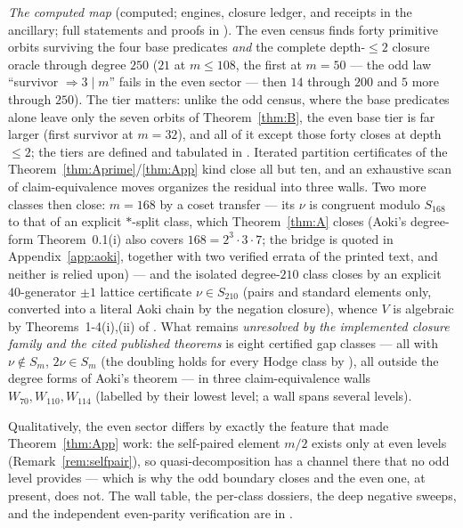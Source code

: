 \documentclass[11pt]{amsart}
\theoremstyle{remark}
\newcommand{\V}{V}
\begin{document}
\emph{The computed map} {\rm(computed; engines, closure ledger, and receipts in the ancillary;
full statements and proofs in \cite{BNeven})}. The even census finds forty primitive
orbits surviving the four base predicates \emph{and} the complete depth-$\le2$ closure oracle
through degree $250$ ($21$ at $m\le108$, the first at $m=50$ --- the odd law ``survivor
$\Rightarrow3\mid m$'' fails in the even sector --- then $14$ through $200$ and $5$ more
through $250$). The tier matters: unlike the odd census, where the base predicates alone leave
only the seven orbits of Theorem~\ref{thm:B}, the even base tier is far larger (first survivor at
$m=32$), and all of it except those forty closes at depth $\le2$; the tiers are defined
and tabulated in \cite{BNeven}. Iterated partition certificates of the
Theorem~\ref{thm:Aprime}/\ref{thm:App} kind close all but ten, and an exhaustive scan of
claim-equivalence moves organizes the residual into three walls. Two more classes then close:
$m=168$ by a coset transfer --- its $\nu$ is congruent modulo $S_{168}$ to that of an explicit
$*$-split class, which Theorem~\ref{thm:A} closes (Aoki's degree-form Theorem~0.1(i)
\cite{Aoki00} also covers $168=2^3\cdot3\cdot7$; the bridge is quoted in
Appendix~\ref{app:aoki}, together with two verified errata of the printed text, and neither is
relied upon) --- and the isolated degree-$210$
class closes by an explicit $40$-generator $\pm1$ lattice certificate $\nu\in S_{210}$ (pairs
and standard elements only, converted into a literal Aoki chain by the negation closure), whence
$\V$ is algebraic by Theorems~1-4(i),(ii) of \cite{Aoki87}. What remains \emph{unresolved by
the implemented closure family and the cited published theorems} is eight certified gap classes
--- all with $\nu\notin S_m$, $2\nu\in S_m$ (the doubling holds for every Hodge class by
\cite[Thm.~2.1]{Aoki00}), all outside the degree forms of Aoki's theorem --- in three claim-equivalence walls
$W_{70},W_{110},W_{114}$ (labelled by their lowest level; a wall spans several levels).

Qualitatively, the even sector differs by exactly the feature that made Theorem~\ref{thm:App}
work: the self-paired element $m/2$ exists only at even levels
(Remark~\ref{rem:selfpair}), so quasi-decomposition has a channel there that no odd level
provides --- which is why the odd boundary closes and the even one, at present, does not. The
wall table, the per-class dossiers, the deep negative sweeps, and the independent even-parity
verification are in \cite{BNeven}.
\end{document}
